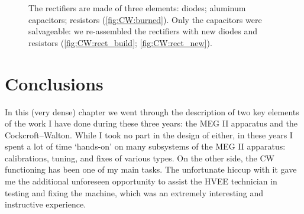 \begin{refsection}
\begin{figure}[ht]
            \hfill
            \caption{The rectifiers are made of three elements: diodes; aluminum capacitors; resistors (\ref{fig:CW:burned}). Only the capacitors were salvageable: we re-assembled the rectifiers with new diodes and resistors (\ref{fig:CW:rect_build}; \ref{fig:CW:rect_new}).}
            \label{fig:CW:fixed}
        \end{figure}

\section{Conclusions}
In this (very dense) chapter we went through the description of two key elements of the work I have done during these three years: the MEG II apparatus and the Cockcroft–Walton.
While I took no part in the design of either, in these years I spent a lot of time `hands-on' on many subsystems of the MEG II apparatus: calibrations, tuning, and fixes of various types.
On the other side, the CW functioning has been one of my main tasks.
The unfortunate hiccup with it gave me the additional unforeseen opportunity to assist the HVEE technician in testing and fixing the machine, which was an extremely interesting and instructive experience. 

\printbibliography[
    heading = bibliographychapter,
    title=Bibliography on MEG II
]

\end{refsection}
